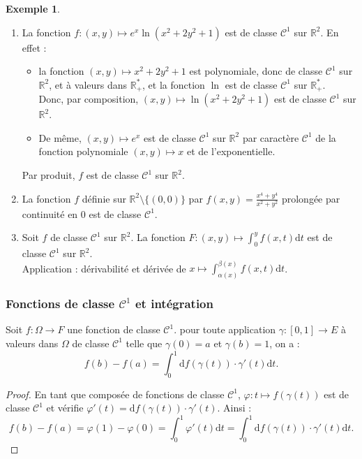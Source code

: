 \documentclass[french]{article}
\newcommand{\R}{\mathbb{R}}
\newcommand{\st}{^*}
\renewcommand{\d}{\text{d}}
\theoremstyle{plain}
\theoremstyle{definition}
\newtheorem*{ex}{Exemple}
\theoremstyle{remark}
\begin{document}
\begin{ex}
	\begin{enumerate}
		\item La fonction $f:(x,y)\mapsto e^x\ln(x^2+2y^2+1)$ est de classe $\mathcal{C}^1$ sur $\R^2$. En effet :
		\begin{itemize}
			\item la fonction $(x,y)\mapsto x^2+2y^2+1$ est polynomiale, donc de classe $\mathcal{C}^1$ sur $\R^2$, et à valeurs dans $\R_+\st$, et la fonction $\ln$ est de classe $\mathcal{C}^1$ sur $\R_+\st$.\\
			Donc, par composition, $(x,y)\mapsto \ln(x^2+2y^2+1)$ est de classe $\mathcal{C}^1$ sur $\R^2$.
			\item De même, $(x,y)\mapsto e^x$ est de classe $\mathcal{C}^1$ sur $\R^2$ par caractère $\mathcal{C}^1$ de la fonction polynomiale $(x,y)\mapsto x$ et de l'exponentielle.
		\end{itemize}
		Par produit, $f$ est de classe $\mathcal{C}^1$ sur $\R^2$.
		\item La fonction $f$ définie sur $\R^2\setminus\{(0,0)\}$ par $\displaystyle f(x,y)=\frac{x^4+y^4}{x^2+y^2}$ prolongée par continuité en $0$ est de classe $\mathcal{C}^1$.
		\item Soit $f$ de classe $\mathcal{C}^1$ sur $\R^2$. La fonction $F:(x,y)\mapsto\displaystyle\int_{0}^{y}f(x,t)\d t$ est de classe $\mathcal{C}^1$ sur $\R^2$.\\
		Application : dérivabilité et dérivée de $x\mapsto\displaystyle\int_{\alpha(x)}^{\beta(x)}f(x,t)\d t$.
	\end{enumerate}
\end{ex}

\subsubsection*{Fonctions de classe $\mathcal{C}^1$ et intégration}

\begin{prop}%
	Soit $f:\Omega\to F$ une fonction de classe $\mathcal{C}^1$. pour toute application $\gamma:[0,1]\to E$ à valeurs dans $\Omega$ de classe $\mathcal{C}^1$ telle que $\gamma(0)=a$ et $\gamma(b)=1$, on a :
	$$f(b)-f(a)=\int_{0}^{1}\d f(\gamma(t))\cdot\gamma'(t)\d t.$$
\end{prop}
\begin{proof}
	En tant que composée de fonctions de classe $\mathcal{C}^1$, $\varphi:t\mapsto f(\gamma(t))$ est de classe $\mathcal{C}^1$ et vérifie $\varphi'(t)=\d f(\gamma(t))\cdot\gamma'(t)$. Ainsi :
	$$f(b)-f(a)=\varphi(1)-\varphi(0)=\int_{0}^{1}\varphi'(t)\d t=\int_{0}^{1}\d f(\gamma(t))\cdot\gamma'(t)\d t.$$
\end{proof}
\end{document}
